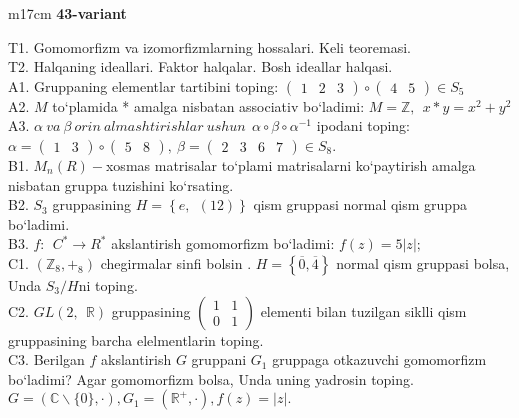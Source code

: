 \documentclass{article}
\begin{document}
\begin{tabular}{m{17cm}}
\textbf{43-variant}
\newline

T1. Gomomorfizm va izomorfizmlarning hossalari. Keli teoremasi. \\
T2. Halqaning ideallari. Faktor halqalar. Bosh ideallar halqasi. \\
A1. Gruppaning elementlar tartibini toping: \(\begin{pmatrix}
1 & 2 & 3
\end{pmatrix} \circ \begin{pmatrix}
4 & 5
\end{pmatrix} \in S_{5}\) \\
A2. \(M\) to`plamida * amalga nisbatan associativ bo`ladimi: \(M\mathbb{= Z},\ \ x*y = x^{2} + y^{2}\) \\
A3. \(\alpha\ va\ \beta\ orin\ almashtirishlar\ ushun\ \ \alpha \circ \beta \circ \alpha^{- 1}\) ipodani toping:\(\alpha = \begin{pmatrix}
1 & 3
\end{pmatrix} \circ \begin{pmatrix}
5 & 8
\end{pmatrix},\ \beta = \begin{pmatrix}
2 & 3 & 6 & 7
\end{pmatrix} \in S_{8}\). \\
B1. \(M_{n}(R) -\)xosmas matrisalar to`plami matrisalarni ko`paytirish amalga nisbatan gruppa tuzishini ko`rsating. \\
B2. \(S_{3}\) gruppasining \(H = \left\{ e,\ \ (12) \right\}\) qism gruppasi normal qism gruppa bo`ladimi. \\
B3. \(f:\ \ C^{*} \rightarrow R^{*}\) akslantirish gomomorfizm bo`ladimi: \(f(z) = 5|z|;\) \\
C1. \(\left( \mathbb{Z}_{8}, +_{8} \right)\) chegirmalar sinfi bo\textquotesingle lsin . \(H = \left\{ \overline{0},\overline{4} \right\}\) normal qism gruppasi bolsa, Unda \(S_{3}/H\)ni toping. \\
C2. \(GL(2,\mathbb{\ \ R})\) gruppasining \(\begin{pmatrix}
1 & 1 \\
0 & 1
\end{pmatrix}\) elementi bilan tuzilgan siklli qism gruppasining barcha elelmentlarin toping. \\
C3. Berilgan \(f\) akslantirish \(G\) gruppani \(G_{1}\) gruppaga o\textquotesingle tkazuvchi gomomorfizm bo`ladimi? Agar gomomorfizm bolsa, Unda uning yadrosin toping.\(G = (\mathbb{C}\backslash\{ 0\}, \cdot ),G_{1} = \left( \mathbb{R}^{+}, \cdot \right),f(z) = |z|.\) \\

\end{tabular}
\vspace{1cm}
\end{document}
